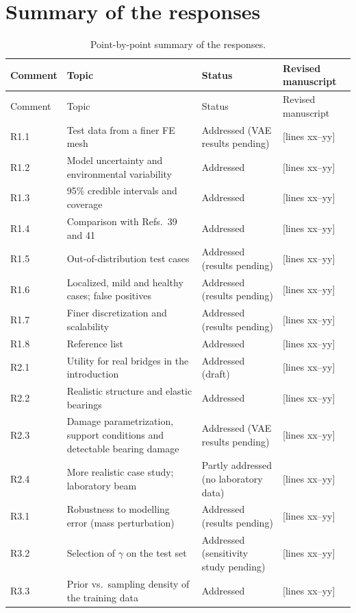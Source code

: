 \documentclass[11pt]{article}
\newcommand{\tbd}[1]{\textcolor{note}{\textsf{[#1]}}}
\newcommand{\lines}[1]{\tbd{lines #1}}
\begin{document}
\section{Summary of the responses}
{\small
\begin{longtable}{p{1.55cm}p{6.0cm}p{3.0cm}p{3.6cm}}
\caption{Point-by-point summary of the responses.}\label{tab:summary}\\
\toprule
Comment & Topic & Status & Revised manuscript \\
\midrule
\endfirsthead
\toprule
Comment & Topic & Status & Revised manuscript \\
\midrule
\endhead
R1.1 & Test data from a finer FE mesh & Addressed (VAE results pending) & \lines{xx--yy} \\
R1.2 & Model uncertainty and environmental variability & Addressed & \lines{xx--yy} \\
R1.3 & 95\% credible intervals and coverage & Addressed & \lines{xx--yy} \\
R1.4 & Comparison with Refs.\ 39 and 41 & Addressed & \lines{xx--yy} \\
R1.5 & Out-of-distribution test cases & Addressed (results pending) & \lines{xx--yy} \\
R1.6 & Localized, mild and healthy cases; false positives & Addressed (results pending) & \lines{xx--yy} \\
R1.7 & Finer discretization and scalability & Addressed (results pending) & \lines{xx--yy} \\
R1.8 & Reference list & Addressed & \lines{xx--yy} \\
R2.1 & Utility for real bridges in the introduction & Addressed (draft) & \lines{xx--yy} \\
R2.2 & Realistic structure and elastic bearings & Addressed & \lines{xx--yy} \\
R2.3 & Damage parametrization, support conditions and detectable bearing damage & Addressed (VAE results pending) & \lines{xx--yy} \\
R2.4 & More realistic case study; laboratory beam & Partly addressed (no laboratory data) & \lines{xx--yy} \\
R3.1 & Robustness to modelling error (mass perturbation) & Addressed (results pending) & \lines{xx--yy} \\
R3.2 & Selection of $\gamma$ on the test set & Addressed (sensitivity study pending) & \lines{xx--yy} \\
R3.3 & Prior vs.\ sampling density of the training data & Addressed & \lines{xx--yy} \\

\end{longtable}}
\end{document}
